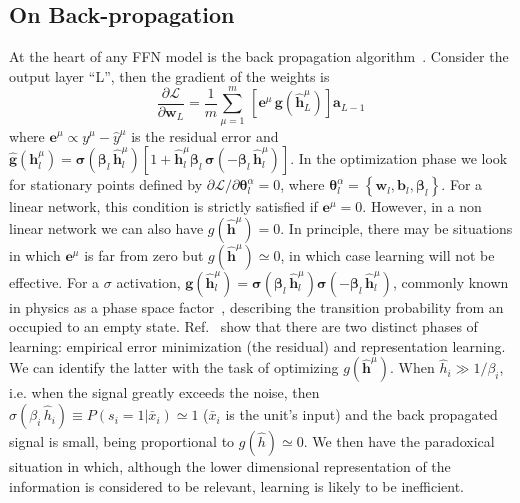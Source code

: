 \documentclass{article}
\begin{document}
\subsection{On Back-propagation} \label{sub:back}
At the heart of any FFN model is the back propagation algorithm~\cite{hertz, bishop}. Consider the output layer ``L'', then the gradient of the weights is
%
\begin{equation} \label{eq:gradsL}
\frac{\partial \mathscr{L}}{\partial \mathbf{w}_L } =  \frac{1}{m} \sum_{\mu=1}^m \, \left[ \mathbf{e}^{\mu} \, \mathbf{g}(\hat{\mathbf{h}}^{\mu} _L) \right]  \mathbf{a}_{L-1}
 \end{equation}
%
where $\mathbf{e}^{\mu}\propto y^{\mu} - \hat{y}^{\mu}$ is the residual error and $\hat{\mathbf{g}}(\mathbf{h}^{\mu}_l) =  \boldsymbol{\sigma}(\boldsymbol{\beta}_l \, \hat{\mathbf{h}}^{\mu}_l)[ 1 + \hat{\mathbf{h}}^{\mu}_l \boldsymbol{\beta}_l \, \boldsymbol{\sigma}(-\boldsymbol{\beta}_l \, \hat{\mathbf{h}}^{\mu}_l) ] $. In the optimization phase we look for stationary points defined by $\partial \mathscr{L}/\partial \boldsymbol{\theta}^{\alpha}_l=0$, where $\boldsymbol{\theta}^{\alpha}_l = \left\{ \mathbf{w}_l, \mathbf{b}_l, \boldsymbol{\beta}_l \right\} $. For a linear network, this condition is  strictly satisfied if $ \mathbf{e}^{\mu}=0$. However, in a non linear network we can also have $g(\hat{\mathbf{h}}^{\mu})=0$. In principle, there may be situations in which $\mathbf{e}^{\mu}$ is far from zero but $g(\hat{\mathbf{h}}^{\mu}) \simeq 0$, in which case learning will not be effective. For a $\sigma$ activation, $\mathbf{g}(\hat{\mathbf{h}}^{\mu}_l) = \boldsymbol{\sigma}(\boldsymbol{\beta}_l \, \hat{\mathbf{h}}^{\mu}_l)\boldsymbol{\sigma}(-\boldsymbol{\beta}_l \, \hat{\mathbf{h}}^{\mu}_l)$, commonly known in physics as a phase space factor~\cite{roberto}, describing the transition probability from an occupied to an empty state. Ref.~\cite{tishby1, tishby2} show that there are two distinct phases of learning: empirical error minimization (the residual) and representation learning. We can identify the latter with the task of optimizing $g(\hat{\mathbf{h}}^{\mu})$. When $\hat{h}_i \gg 1/\beta_i$, i.e. when the signal greatly exceeds the noise, then $\sigma( \beta_i \,\hat{ h}_i) \equiv P(s_i=1| \bar{x}_i)  \simeq 1$ ($\bar{x}_i$ is the unit's input) and the back propagated signal is small, being proportional to $g(\hat{h} ) \simeq 0$. We then have the paradoxical situation in which, although the lower dimensional representation of the information is considered to be relevant, learning is likely to be inefficient.
\end{document}
